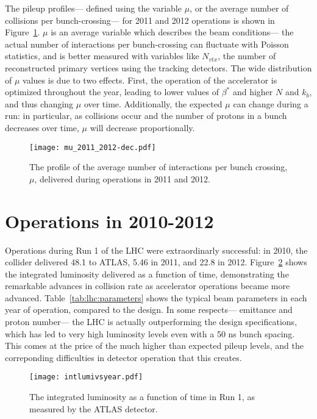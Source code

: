 The pileup profiles--- defined using the variable $\mu$, or the average number of collisions per bunch-crossing--- for 2011 and 2012 operations is shown in Figure~\ref{fig:lhc:mu-profile}. $\mu$ is an average variable which describes the beam conditions--- the actual number of interactions per bunch-crossing can fluctuate with Poisson statistics, and is better measured with variables like $N_{vtx}$, the number of reconstructed primary vertices using the tracking detectors. The wide distribution of $\mu$ values is due to two effects. First, the operation of the accelerator is optimized throughout the year, leading to lower values of $\beta^*$ and higher $N$ and $k_b$, and thus changing $\mu$ over time. Additionally, the expected $\mu$ can change during a run: in particular, as collisions occur and the number of protons in a bunch decreases over time, $\mu$ will decrease proportionally.


\begin{figure}
\centering
\texttt{[image: mu\_2011\_2012-dec.pdf]}
\label{fig:lhc:mu-profile}
\caption{The profile of the average number of interactions per bunch crossing, $\mu$, delivered during operations in 2011 and 2012.}
\end{figure}



\section{Operations in 2010-2012}

Operations during Run 1 of the LHC were extraordinarly successful: in 2010, the collider delivered 48.1 \ipb to ATLAS, 5.46 \ifb in 2011, and 22.8 \ifb in 2012. Figure~\ref{fig:lhc:lumivsyear} shows the integrated luminosity delivered as a function of time, demonstrating the remarkable advances in collision rate as accelerator operations became more advanced. Table~\ref{tab:lhc:parameters} shows the typical beam parameters in each year of operation, compared to the design. In some respects--- emittance and proton number--- the LHC is actually outperforming the design specifications, which has led to very high luminosity levels even with a 50 ns bunch spacing. This comes at the price of the much higher than expected pileup levels, and the correponding difficulties in detector operation that this creates.


\begin{figure}
\centering
\texttt{[image: intlumivsyear.pdf]}
\label{fig:lhc:lumivsyear}
\caption{The integrated luminosity as a function of time in Run 1, as measured by the ATLAS detector.}
\end{figure}

